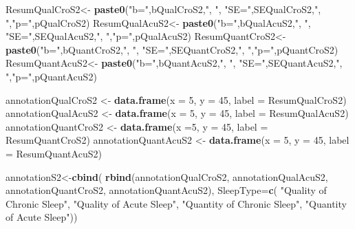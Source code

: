 \documentclass[
]{book}
\newenvironment{Shaded}{\begin{snugshade}}{\end{snugshade}}
\newcommand{\DataTypeTok}[1]{\textcolor[rgb]{0.13,0.29,0.53}{#1}}
\newcommand{\DecValTok}[1]{\textcolor[rgb]{0.00,0.00,0.81}{#1}}
\newcommand{\KeywordTok}[1]{\textcolor[rgb]{0.13,0.29,0.53}{\textbf{#1}}}
\newcommand{\NormalTok}[1]{#1}
\newcommand{\StringTok}[1]{\textcolor[rgb]{0.31,0.60,0.02}{#1}}
\begin{document}
\begin{Shaded}
\begin{Highlighting}[]
\NormalTok{ResumQualCroS2<-}\StringTok{ }\KeywordTok{paste0}\NormalTok{(}\StringTok{"b="}\NormalTok{,bQualCroS2,}\StringTok{", "}\NormalTok{, }\StringTok{"SE="}\NormalTok{,SEQualCroS2,}\StringTok{", "}\NormalTok{,}\StringTok{"p="}\NormalTok{,pQualCroS2)}
\NormalTok{ResumQualAcuS2<-}\StringTok{ }\KeywordTok{paste0}\NormalTok{(}\StringTok{"b="}\NormalTok{,bQualAcuS2,}\StringTok{", "}\NormalTok{, }\StringTok{"SE="}\NormalTok{,SEQualAcuS2,}\StringTok{", "}\NormalTok{,}\StringTok{"p="}\NormalTok{,pQualAcuS2)}
\NormalTok{ResumQuantCroS2<-}\StringTok{ }\KeywordTok{paste0}\NormalTok{(}\StringTok{"b="}\NormalTok{,bQuantCroS2,}\StringTok{", "}\NormalTok{, }\StringTok{"SE="}\NormalTok{,SEQuantCroS2,}\StringTok{", "}\NormalTok{,}\StringTok{"p="}\NormalTok{,pQuantCroS2)}
\NormalTok{ResumQuantAcuS2<-}\StringTok{ }\KeywordTok{paste0}\NormalTok{(}\StringTok{"b="}\NormalTok{,bQuantAcuS2,}\StringTok{", "}\NormalTok{, }\StringTok{"SE="}\NormalTok{,SEQuantAcuS2,}\StringTok{", "}\NormalTok{,}\StringTok{"p="}\NormalTok{,pQuantAcuS2)}

\NormalTok{annotationQualCroS2 <-}\StringTok{ }\KeywordTok{data.frame}\NormalTok{(}\DataTypeTok{x =} \DecValTok{5}\NormalTok{, }\DataTypeTok{y =} \DecValTok{45}\NormalTok{,  }\DataTypeTok{label =}\NormalTok{ ResumQualCroS2)}
\NormalTok{annotationQualAcuS2 <-}\StringTok{ }\KeywordTok{data.frame}\NormalTok{(}\DataTypeTok{x =} \DecValTok{5}\NormalTok{, }\DataTypeTok{y =} \DecValTok{45}\NormalTok{,  }\DataTypeTok{label =}\NormalTok{ ResumQualAcuS2)}
\NormalTok{annotationQuantCroS2 <-}\StringTok{ }\KeywordTok{data.frame}\NormalTok{(}\DataTypeTok{x =}\DecValTok{5}\NormalTok{, }\DataTypeTok{y =} \DecValTok{45}\NormalTok{,  }\DataTypeTok{label =}\NormalTok{ ResumQuantCroS2)}
\NormalTok{annotationQuantAcuS2 <-}\StringTok{ }\KeywordTok{data.frame}\NormalTok{(}\DataTypeTok{x =} \DecValTok{5}\NormalTok{, }\DataTypeTok{y =} \DecValTok{45}\NormalTok{,  }\DataTypeTok{label =}\NormalTok{ ResumQuantAcuS2)}

\NormalTok{annotationS2<-}\KeywordTok{cbind}\NormalTok{(}
  \KeywordTok{rbind}\NormalTok{(annotationQualCroS2, }
\NormalTok{        annotationQualAcuS2, }
\NormalTok{        annotationQuantCroS2, }
\NormalTok{        annotationQuantAcuS2),}
  \DataTypeTok{SleepType=}\KeywordTok{c}\NormalTok{(}
        \StringTok{"Quality of Chronic Sleep"}\NormalTok{, }
        \StringTok{"Quality of Acute Sleep"}\NormalTok{, }
        \StringTok{"Quantity of Chronic Sleep"}\NormalTok{, }
        \StringTok{"Quantity of Acute Sleep"}\NormalTok{))}
\end{Highlighting}
\end{Shaded}
\end{document}
